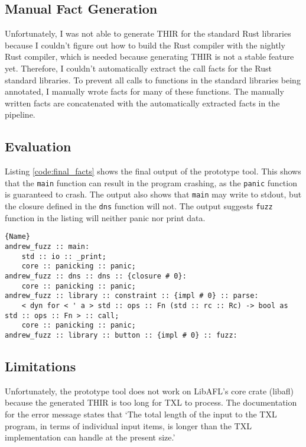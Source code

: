 \documentclass[11pt]{article}
\begin{document}
\subsection{Manual Fact Generation}

Unfortunately, I was not able to generate THIR for the standard Rust libraries because I couldn't figure out how to build the Rust compiler with the nightly Rust compiler, which is needed because generating THIR is not a stable feature yet.
Therefore, I couldn't automatically extract the call facts for the Rust standard libraries.
To prevent all calls to functions in the standard libraries being annotated, I manually wrote facts for many of these functions.
The manually written facts are concatenated with the automatically extracted facts in the pipeline.

\subsection{Evaluation}

Listing \ref{code:final_facts} shows the final output of the prototype tool.
This shows that the \lstinline{main} function can result in the program crashing, as the \lstinline{panic} function is guaranteed to crash.
The output also shows that \lstinline{main} may write to stdout, but the closure defined in the \lstinline{dns} function will not.
The output suggests \lstinline{fuzz} function in the listing will neither panic nor print data.

\begin{lstlisting}[caption=External Function Annotions, label=code:final_facts]{Name}
andrew_fuzz :: main:
	std :: io :: _print;
	core :: panicking :: panic;
andrew_fuzz :: dns :: dns :: {closure # 0}:
	core :: panicking :: panic;
andrew_fuzz :: library :: constraint :: {impl # 0} :: parse:
	< dyn for < ' a > std :: ops :: Fn (std :: rc :: Rc) -> bool as std :: ops :: Fn > :: call;
	core :: panicking :: panic;
andrew_fuzz :: library :: button :: {impl # 0} :: fuzz:
\end{lstlisting}

\subsection{Limitations}

Unfortunately, the prototype tool does not work on LibAFL's core crate (libafl) because the generated THIR is too long for TXL to process.
The documentation for the error message states that `The total length of the input to the TXL program, in terms of individual input items, is longer than the TXL implementation can handle at the present size.'
\end{document}
